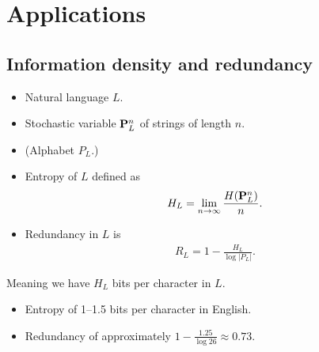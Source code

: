 


\section{Applications}

\subsection{Information density and redundancy}

\begin{frame}
  \begin{definition}
    \begin{itemize}
      \item Natural language \(L\).
      \item Stochastic variable \(\mathbf P^n_L\) of strings of length \(n\).
      \item (Alphabet \(P_L\).)
      \item Entropy of \(L\) defined as
        \begin{align*}
          H_L = \lim_{n\to \infty}\frac{H(\mathbf P^n_L)}{n}.
        \end{align*}
      \item Redundancy in \(L\) is
        \begin{align*}
          R_L = 1 - \frac{H_L}{\log |P_L|}.
        \end{align*}
    \end{itemize}
  \end{definition}
\end{frame}

\begin{frame}
  \begin{remark}
    Meaning we have \(H_L\) bits per character in \(L\).
  \end{remark}

  \begin{example}
    \begin{itemize}
      \item Entropy of 1--1.5 bits per character in English.
      \item Redundancy of approximately \(1 - \frac{1.25}{\log 26} \approx 
          0.73\).
    \end{itemize}
  \end{example}

\end{frame}

